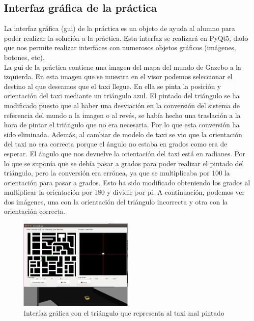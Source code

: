 \subsection{Interfaz gráfica de la práctica}

La interfaz gráfica (\acrshort{gui}) de la práctica es un objeto de ayuda al alumno para poder realizar la solución a la práctica. Esta interfaz se realizará en PyQt5, dado que nos permite realizar interfaces con numerosos objetos gráficos (imágenes, botones, etc).\\


La \acrshort{gui} de la práctica contiene una imagen del mapa del mundo de Gazebo a la izquierda. En esta imagen que se muestra en el visor podemos seleccionar el destino al que deseamos que el taxi llegue. En ella se pinta la posición y orientación del taxi mediante un triángulo azul. El pintado del triángulo se ha modificado puesto que al haber una desviación en la conversión del sistema de referencia del mundo a la imagen o al revés, se había hecho una traslación a la hora de pintar el triángulo que no era necesaria. Por lo que esta conversión ha sido eliminada. Además, al cambiar de modelo de taxi se vio que la orientación del taxi no era correcta porque el ángulo no estaba en grados como era de esperar. El ángulo que nos devuelve la orientación del taxi está en radianes. Por lo que se suponía que se debía pasar a grados para poder realizar el pintado del triángulo, pero la conversión era errónea, ya que se multiplicaba por 100 la orientación para pasar a grados. Esto ha sido modificado obteniendo los grados al multiplicar la orientación por 180 y dividir por pi. A continuación, podemos ver dos imágenes, una con la orientación del triángulo incorrecta y otra con la orientación correcta.\\

\begin{figure}[H]
  \begin{center}
    \includegraphics[width=0.5\textwidth]{figures/GPP/triangulo_girado_mal.png}
		\caption{Interfaz gráfica con el triángulo que representa al taxi mal pintado}
		\label{fig.triangulo_girado_mal}
		\end{center}
\end{figure}

